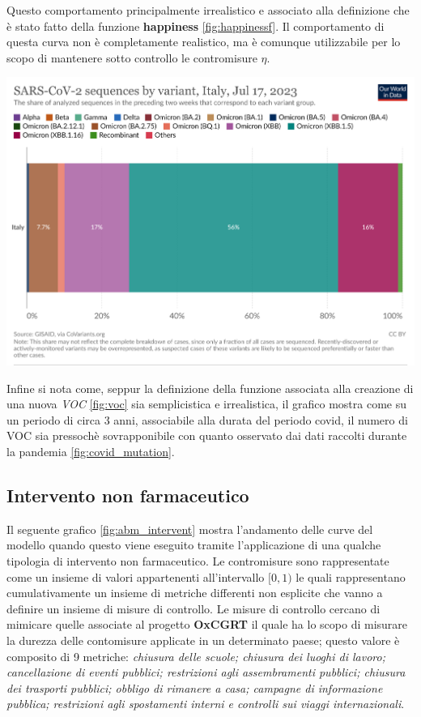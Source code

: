 Questo comportamento principalmente irrealistico e associato alla definizione che è stato fatto della 
funzione \textbf{happiness} \ref{fig:happinessf}. Il comportamento di questa curva non è completamente 
realistico, ma è comunque utilizzabile per lo scopo di mantenere sotto controllo le contromisure $\eta$.

\begin{minipage}{\linewidth}
	\centering
	\includegraphics[width=\textwidth]{img/coronavirus-data-explorer.png}
	\label{fig:covid_mutation}
\end{minipage}

Infine si nota come, seppur la definizione della funzione associata alla creazione di una
nuova \emph{VOC} \ref{fig:voc} sia semplicistica e irrealistica, il grafico mostra come 
su un periodo di circa 3 anni, associabile alla durata del periodo covid, 
il numero di VOC sia pressochè sovrapponibile con quanto osservato dai dati 
raccolti durante la pandemia \ref{fig:covid_mutation}. 
\newpage

\subsection{Intervento non farmaceutico}
Il seguente grafico \ref{fig:abm_intervent} mostra l'andamento delle curve del modello
quando questo viene eseguito tramite l'applicazione di una qualche tipologia di intervento non farmaceutico. 
Le contromisure sono rappresentate come un insieme di valori appartenenti all'intervallo $[0, 1)$ 
le quali rappresentano cumulativamente un insieme di metriche differenti non esplicite che vanno a definire 
un insieme di misure di controllo. Le misure di controllo cercano di mimicare quelle associate al progetto 
\textbf{OxCGRT} il quale ha lo scopo di misurare la durezza delle contomisure applicate in un determinato paese; 
questo valore è composito di 9 metriche: \emph{chiusura delle scuole; chiusura dei luoghi di lavoro; 
cancellazione di eventi pubblici; restrizioni agli assembramenti pubblici; 
chiusura dei trasporti pubblici; obbligo di rimanere a casa; campagne di informazione pubblica; 
restrizioni agli spostamenti interni e controlli sui viaggi internazionali}.

